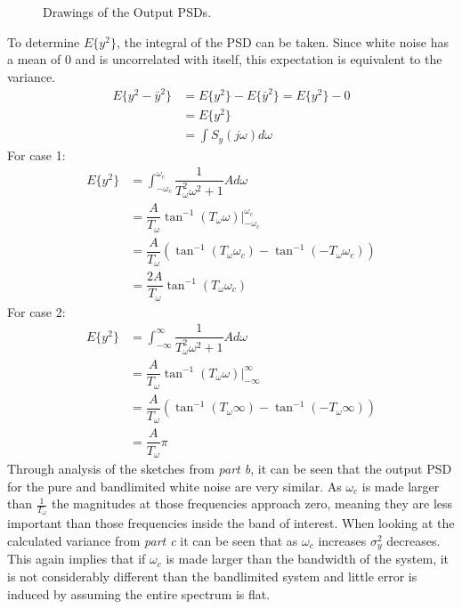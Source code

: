 \documentclass[11pt]{article}
\begin{document}
\begin{enumerate}[label=\textbf{\arabic*.}]
\begin{figure}[H]
    \caption{Drawings of the Output PSDs.}
  \end{figure}
  To determine $E\{y^2\}$, the integral of the PSD can be taken. Since white noise 
  has a mean of 0 and is uncorrelated with itself, this expectation is equivalent 
  to the variance.
  \begin{equation*}
    \begin{split}
      E\{y^2 - \bar{y}^2\} &= E\{y^2\} - E\{\bar{y}^2\} = E\{y^2\} - 0 \\
      &= E\{y^2\} \\
      &= \int S_y(j\omega) d\omega
    \end{split}
  \end{equation*}
  For case 1:
  \begin{equation*}
    \begin{split}
      E\{y^2\} &= \int_{-\omega_c}^{\omega_c} \dfrac{1}{T_{\omega}^2 \omega^2 + 1} A d\omega \\
      &= \dfrac{A}{T_{\omega}} \tan^{-1}(T_{\omega}\omega) \biggr|_{-\omega_c}^{\omega_c} \\
      &= \dfrac{A}{T_{\omega}} \left( \tan^{-1}(T_{\omega}\omega_c) - \tan^{-1}(-T_{\omega}\omega_c) \right) \\
      &= \dfrac{2A}{T_{\omega}} \tan^{-1}(T_{\omega}\omega_c)
    \end{split}
  \end{equation*}
  For case 2:
  \begin{equation*}
    \begin{split}
      E\{y^2\} &= \int_{-\infty}^{\infty} \dfrac{1}{T_{\omega}^2 \omega^2 + 1} A d\omega \\
      &= \dfrac{A}{T_{\omega}} \tan^{-1}(T_{\omega}\omega) \biggr|_{-\infty}^{\infty} \\
      &= \dfrac{A}{T_{\omega}} \left( \tan^{-1}(T_{\omega}\infty) - \tan^{-1}(-T_{\omega}\infty) \right) \\
      &= \dfrac{A}{T_{\omega}} \pi
    \end{split}
  \end{equation*}
  Through analysis of the sketches from \emph{part b}, it can be seen that the output 
  PSD for the pure and bandlimited white noise are very similar. As $\omega_c$ is 
  made larger than $\frac{1}{T_{\omega}}$ the magnitudes at those frequencies approach 
  zero, meaning they are less important than those frequencies inside the band of 
  interest. When looking at the calculated variance from \emph{part c} it can be seen 
  that as $\omega_c$ increases $\sigma^2_y$ decreases. This again implies that if 
  $\omega_c$ is made larger than the bandwidth of the system, it is not considerably 
  different than the bandlimited system and little error is induced by assuming the 
  entire spectrum is flat.

\end{enumerate}
\end{document}
